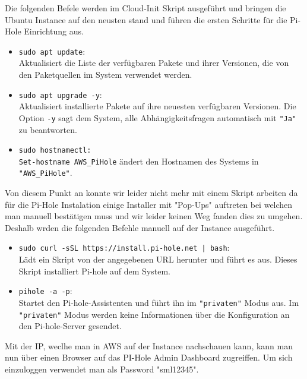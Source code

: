 \documentclass{article}
\begin{document}
\clearpage

\noindent Die folgenden Befele werden im Cloud-Init Skript ausgeführt und bringen die Ubuntu Instance auf den neusten stand und führen die ersten Schritte für die Pi-Hole Einrichtung aus.

\begin{itemize}
\item \texttt{sudo apt update}: \\
Aktualisiert die Liste der verfügbaren Pakete und ihrer Versionen, die von den Paketquellen im System verwendet werden.

\item \texttt{sudo apt upgrade -y}: \\
Aktualisiert installierte Pakete auf ihre neuesten verfügbaren Versionen. Die Option \texttt{-y} sagt dem System, alle Abhängigkeitsfragen automatisch mit \texttt{"Ja"} zu beantworten.

\item \texttt{sudo hostnamectl: \\
Set-hostname AWS\_PiHole} ändert den Hostnamen des Systems in \\
\texttt{"AWS\_PiHole"}.
\end{itemize}

\noindent Von diesem Punkt an konnte wir leider nicht mehr mit einem Skript arbeiten da für die Pi-Hole Instalation einige Installer mit "Pop-Ups" auftreten bei welchen man manuell bestätigen muss und wir leider keinen Weg fanden dies zu umgehen. Deshalb wrden die folgenden Befehle manuell auf der Instance ausgeführt.

\begin{itemize}
    \item \texttt{sudo curl -sSL https://install.pi-hole.net | bash}: \\
Lädt ein Skript von der angegebenen URL herunter und führt es aus. Dieses Skript installiert Pi-hole auf dem System.

\item \texttt{pihole -a -p}: \\
Startet den Pi-hole-Assistenten und führt ihn im \texttt{"privaten"} Modus aus. Im \texttt{"privaten"} Modus werden keine Informationen über die Konfiguration an den Pi-hole-Server gesendet.
\end{itemize}

\noindent Mit der IP, weclhe man in AWS auf der Instance nachschauen kann, kann man nun über einen Browser auf das PI-Hole Admin Dashboard zugreiffen. Um sich einzuloggen verwendet man als Password "sml12345".
\end{document}
